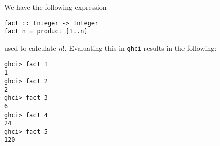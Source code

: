 
We have the following expression 
\begin{verbatim}
fact :: Integer -> Integer
fact n = product [1..n]
\end{verbatim}
used to calculate $n!$. Evaluating this in \verb|ghci| results in the 
following:
\begin{verbatim}
ghci> fact 1
1
ghci> fact 2
2
ghci> fact 3
6
ghci> fact 4
24
ghci> fact 5
120
\end{verbatim}
